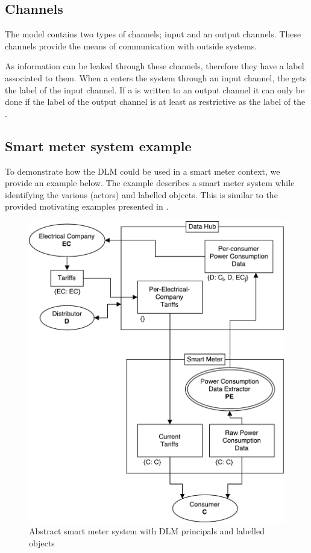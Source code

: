 \subsection{Channels}
The model contains two types of channels; input and an output channels.
These channels provide the means of communication with outside systems.

As information can be leaked through these channels, therefore they have a label associated to them.
When a \xvalue{} enters the system through an input channel, the \xvalue{} gets the label of the input channel.
If a \xvalue{} is written to an output channel it can only be done if the label of the output channel is at least as restrictive as the label of the \xvalue{}.

\subsection{Smart meter system example}\label{dlm-example}
To demonstrate how the DLM could be used in a smart meter context, we provide an example below.
The example describes a smart meter system while identifying the various \principals{} (actors) and labelled objects.
This is similar to the provided motivating examples presented in \citet{myers1997decentralized}.

\begin{figure}[h]
\centering
\includegraphics[width=\textwidth]{figures/dlm_sm_example.pdf}
\caption{Abstract smart meter system with DLM principals and labelled objects}
\label{dlm:sm_example}
\end{figure}

